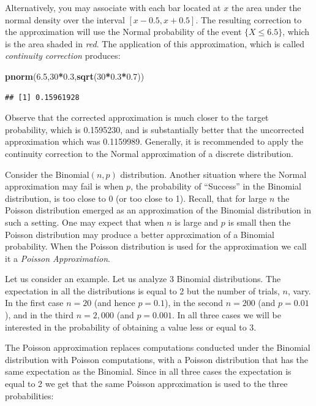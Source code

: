 \documentclass[]{krantz}
\makeatletter
\newenvironment{Shaded}{\begin{snugshade}}{\end{snugshade}}
\newcommand{\KeywordTok}[1]{\textcolor[rgb]{0.13,0.29,0.53}{\textbf{#1}}}
\newcommand{\DecValTok}[1]{\textcolor[rgb]{0.00,0.00,0.81}{#1}}
\newcommand{\FloatTok}[1]{\textcolor[rgb]{0.00,0.00,0.81}{#1}}
\newcommand{\OperatorTok}[1]{\textcolor[rgb]{0.81,0.36,0.00}{\textbf{#1}}}
\newcommand{\NormalTok}[1]{#1}
\newenvironment{kframe}{%
\medskip{}
\setlength{\fboxsep}{.8em}
 \def\at@end@of@kframe{}%
 \ifinner\ifhmode%
  \def\at@end@of@kframe{\end{minipage}}%
  \begin{minipage}{\columnwidth}%
 \fi\fi%
 \def\FrameCommand##1{\hskip\@totalleftmargin \hskip-\fboxsep
 \colorbox{shadecolor}{##1}\hskip-\fboxsep
     \hskip-\linewidth \hskip-\@totalleftmargin \hskip\columnwidth}%
 \MakeFramed {\advance\hsize-\width
   \@totalleftmargin\z@ \linewidth\hsize
   \@setminipage}}%
 {\par\unskip\endMakeFramed%
 \at@end@of@kframe}
\renewenvironment{Shaded}{\begin{kframe}}{\end{kframe}}
\theoremstyle{definition}
\theoremstyle{definition}
\theoremstyle{definition}
\theoremstyle{remark}
\makeatother
\begin{document}
Alternatively, you may associate with each bar located at \(x\) the area
under the normal density over the interval \([x-0.5, x+0.5]\). The
resulting correction to the approximation will use the Normal
probability of the event \(\{X \leq 6.5\}\), which is the area shaded in
\emph{red}. The application of this approximation, which is called
\emph{continuity correction} produces:

\begin{Shaded}
\begin{Highlighting}[]
\KeywordTok{pnorm}\NormalTok{(}\FloatTok{6.5}\NormalTok{,}\DecValTok{30}\OperatorTok{*}\FloatTok{0.3}\NormalTok{,}\KeywordTok{sqrt}\NormalTok{(}\DecValTok{30}\OperatorTok{*}\FloatTok{0.3}\OperatorTok{*}\FloatTok{0.7}\NormalTok{))}
\end{Highlighting}
\end{Shaded}

\begin{verbatim}
## [1] 0.15961928
\end{verbatim}

Observe that the corrected approximation is much closer to the target
probability, which is 0.1595230, and is substantially better that the
uncorrected approximation which was 0.1159989. Generally, it is
recommended to apply the continuity correction to the Normal
approximation of a discrete distribution.

Consider the \(\mathrm{Binomial}(n,p)\) distribution. Another situation
where the Normal approximation may fail is when \(p\), the probability
of ``Success'' in the Binomial distribution, is too close to 0 (or too
close to 1). Recall, that for large \(n\) the Poisson distribution
emerged as an approximation of the Binomial distribution in such a
setting. One may expect that when \(n\) is large and \(p\) is small then
the Poisson distribution may produce a better approximation of a
Binomial probability. When the Poisson distribution is used for the
approximation we call it a \emph{Poisson Approximation}.

Let us consider an example. Let us analyze 3 Binomial distributions. The
expectation in all the distributions is equal to 2 but the number of
trials, \(n\), vary. In the first case \(n=20\) (and hence \(p=0.1\)),
in the second \(n=200\) (and \(p=0.01\)), and in the third \(n=2,000\)
(and \(p=0.001\). In all three cases we will be interested in the
probability of obtaining a value less or equal to 3.

The Poisson approximation replaces computations conducted under the
Binomial distribution with Poisson computations, with a Poisson
distribution that has the same expectation as the Binomial. Since in all
three cases the expectation is equal to 2 we get that the same Poisson
approximation is used to the three probabilities:
\end{document}
